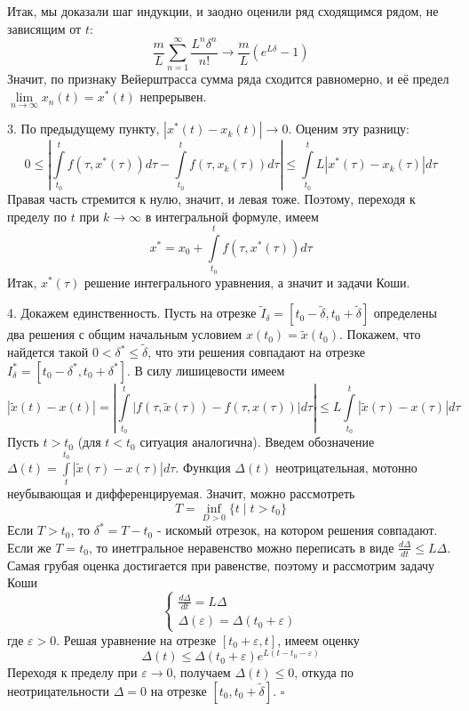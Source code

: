 Итак, мы доказали шаг индукции, и заодно оценили ряд сходящимся рядом, не 
зависящим от $t:$
$$\frac{m}{L}\sum\limits_{n=1}^{\infty}\frac{L^n\delta^n}{n!}\to
\frac{m}{L}\left( e^{L\delta}-1 \right)$$
Значит, по признаку Вейерштрасса сумма ряда сходится равномерно, и её 
предел $\lim\limits_{n \to \infty}x_n(t)=x^*(t)$ непрерывен. 

3. По предыдущему пункту, $|x^*(t)-x_k(t)|\to 0$. Оценим эту разницу:
$$0\leqslant 
\left| \int\limits_{t_0}^{t} f(\tau,x^*(\tau))d\tau-\int\limits_{t_0}^{t}
f(\tau,x_k(\tau))d\tau\right|\leqslant 
\int\limits_{t_0}^{t}L|x^*(\tau)-x_k(\tau)|d\tau$$
Правая часть стремится к нулю, значит, и левая тоже. Поэтому, переходя к
пределу  по $t$ при  $k\to \infty$ в интегральной формуле, имеем
$$x^*=x_0+\int\limits_{t_0}^{t}f(\tau,x^*(\tau))d\tau$$
Итак, $x^*(\tau)$ решение интегрального уравнения, а значит и задачи Коши. 

4. Докажем единственность. Пусть на отрезке $\tilde I_\delta=
[t_0-\tilde\delta,t_0+\tilde\delta]$ определены
два решения с общим начальным условием $x(t_0)=\tilde x(t_0)$.
Покажем, что найдется такой $0<\delta^*\leqslant \tilde\delta$,
что эти решения 
совпадают на отрезке $I^*_\delta = [t_0-\delta^*,t_0+\delta^*]$.
В силу лишицевости имеем
$$|\tilde x(t) - x(t)| = \left|\int\limits_{t_0}^{t}\big|f(\tau,\tilde 
x(\tau))-f(\tau,x(\tau))\big| d\tau \right| \leqslant 
L\int\limits_{t_0}^{t}|\tilde x(\tau) - x(\tau)|d\tau$$
Пусть $t>t_0$ (для $t<t_0$ ситуация аналогична). Введем обозначение
$\Delta(t) = \int\limits_{t}^{t_0} |\tilde x(\tau) - x(\tau)|d\tau$.  
Функция $\Delta(t)$ неотрицательная, мотонно неубывающая и дифференцируемая.
Значит, можно рассмотреть
 $$T=\inf\limits_{D>0}\{t\mid t>t_0\}$$ 
Если $T>t_0$, то $\delta^* = T - t_0$ - искомый отрезок, на котором решения
совпадают. Если же $T=t_0$, то инетгральное неравенство можно переписать
в виде $\frac{d\Delta}{dt}\leqslant L\Delta$. Самая грубая оценка достигается
при равенстве, поэтому и рассмотрим задачу Коши
$$\begin{cases}
    \frac{d\Delta}{dt} = L\Delta \\
    \Delta(\varepsilon) = \Delta(t_0+\varepsilon)
\end{cases}$$
где $\varepsilon>0$. Решая уравнение на отрезке $[t_0+\varepsilon,t]$,
имеем оценку
$$\Delta(t)\leqslant \Delta(t_0+\varepsilon)e^{L(t-t_0-\varepsilon)}$$
Переходя к пределу при $\varepsilon\to 0$, получаем 
$\Delta(t)\leqslant 0$, откуда по неотрицательности $\Delta=0$
на отрезке  $[t_0,t_0+\tilde\delta]$. $\square$


